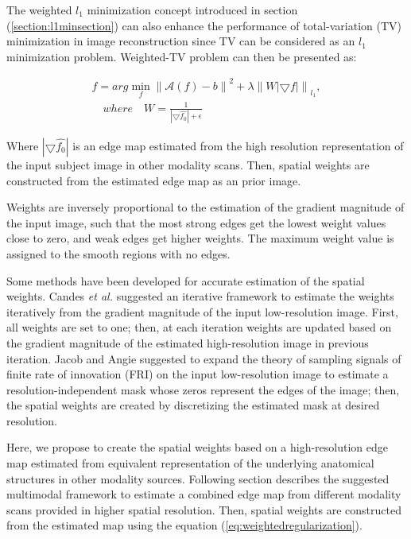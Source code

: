 The weighted $l_{1}$ minimization concept introduced in section (\ref{section:l1minsection}) can also enhance the performance of total-variation (TV) minimization in image reconstruction since TV can be considered as an $l_{1}$ minimization problem. Weighted-TV problem can then be presented as:

\begin{equation}
\label{eq:weightedregularization}
\begin{gathered}
\widehat{f} = arg\min_{f}\left\|\mathcal{A}(f)-b\right\|^{2} + \lambda \left \| W \left | \bigtriangledown f \right | \right \|_{l_{1}}, \\
\quad where \quad W = \frac{1}{\left | \bigtriangledown \widehat{f_{0}} \right |+\epsilon }
\end{gathered}
\end{equation}

Where $\left | \bigtriangledown \widehat{f_{0}} \right |$ is an edge map estimated from the high resolution representation of the input subject image in other modality scans. Then, spatial weights are constructed from the estimated edge map as an prior image.

Weights are inversely proportional to the estimation of the gradient magnitude of the input image, such that the most strong edges get the lowest weight values close to zero, and weak edges get higher weights. The maximum weight value is assigned to the smooth regions with no edges.

Some methods have been developed for accurate estimation of the spatial weights. 
Candes \emph{et al.} \cite{candes2008enhancing} suggested an iterative framework to estimate the weights iteratively from the gradient magnitude of the input low-resolution image. First, all weights are set to one; then, at each iteration weights are updated based on the gradient magnitude of the estimated high-resolution image in previous iteration.
Jacob and Angie \cite{ongie2015} suggested to expand the theory of sampling signals of finite rate of innovation (FRI) on the input low-resolution image to estimate a resolution-independent mask whose zeros represent the edges of the image; then, the spatial weights are created by discretizing the estimated mask at desired resolution.

Here, we propose to create the spatial weights based on a high-resolution edge map estimated from equivalent representation of the underlying anatomical structures in other modality sources.
Following section describes the suggested multimodal framework to estimate a combined edge map from different modality scans provided in higher spatial resolution. Then, spatial weights are constructed from the estimated map using the equation (\ref{eq:weightedregularization}).

